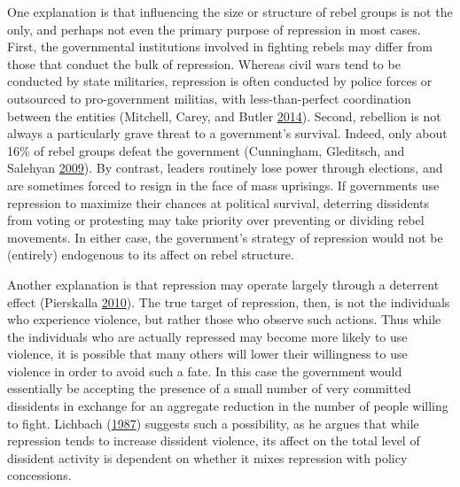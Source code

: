\documentclass[12pt,]{book}
\theoremstyle{definition}
\theoremstyle{definition}
\theoremstyle{definition}
\theoremstyle{remark}
\begin{document}
One explanation is that influencing the size or structure of rebel
groups is not the only, and perhaps not even the primary purpose of
repression in most cases. First, the governmental institutions involved
in fighting rebels may differ from those that conduct the bulk of
repression. Whereas civil wars tend to be conducted by state militaries,
repression is often conducted by police forces or outsourced to
pro-government militias, with less-than-perfect coordination between the
entities (Mitchell, Carey, and Butler
\protect\hyperlink{ref-Mitchell2014}{2014}). Second, rebellion is not
always a particularly grave threat to a government's survival. Indeed,
only about 16\% of rebel groups defeat the government (Cunningham,
Gleditsch, and Salehyan \protect\hyperlink{ref-Cunningham2009}{2009}).
By contrast, leaders routinely lose power through elections, and are
sometimes forced to resign in the face of mass uprisings. If governments
use repression to maximize their chances at political survival,
deterring dissidents from voting or protesting may take priority over
preventing or dividing rebel movements. In either case, the government's
strategy of repression would not be (entirely) endogenous to its affect
on rebel structure.

Another explanation is that repression may operate largely through a
deterrent effect (Pierskalla
\protect\hyperlink{ref-Pierskalla2010}{2010}). The true target of
repression, then, is not the individuals who experience violence, but
rather those who observe such actions. Thus while the individuals who
are actually repressed may become more likely to use violence, it is
possible that many others will lower their willingness to use violence
in order to avoid such a fate. In this case the government would
essentially be accepting the presence of a small number of very
committed dissidents in exchange for an aggregate reduction in the
number of people willing to fight. Lichbach
(\protect\hyperlink{ref-Lichbach1987}{1987}) suggests such a
possibility, as he argues that while repression tends to increase
dissident violence, its affect on the total level of dissident activity
is dependent on whether it mixes repression with policy concessions.
\end{document}
